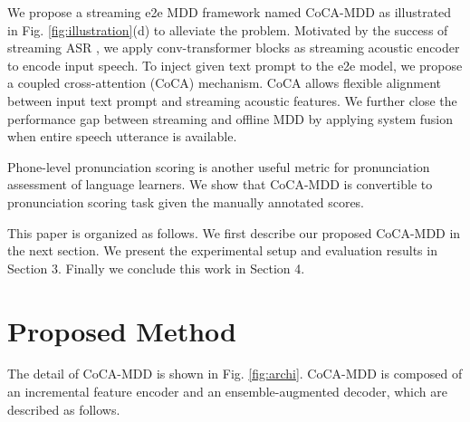 \documentclass[a4paper]{article}
\begin{document}
We propose a streaming e2e MDD framework named CoCA-MDD as illustrated in Fig. \ref{fig:illustration}(d) to alleviate the problem. Motivated by the success of streaming ASR \cite{He2019StreamingES, Huang2020ConvTransformerTL, Li2020TowardsFA}, we apply conv-transformer blocks \cite{Huang2020ConvTransformerTL} as streaming acoustic encoder to encode input speech. To inject given text prompt to the e2e model, we propose a coupled cross-attention (CoCA) mechanism. CoCA allows flexible alignment between input text prompt and streaming acoustic features. %
We further close the performance gap between streaming and offline MDD by applying system fusion when entire speech utterance is available.

Phone-level pronunciation scoring is another useful metric for pronunciation assessment of language learners. We show that CoCA-MDD is convertible to pronunciation scoring task given the manually annotated scores.

This paper is organized as follows. We first describe our proposed CoCA-MDD in the next section. We present the experimental setup and evaluation results in Section 3. Finally we conclude this work in Section 4. 

\section{Proposed Method}
The detail of CoCA-MDD  is shown in Fig. \ref{fig:archi}. CoCA-MDD is composed of an incremental feature encoder and an ensemble-augmented decoder, which are described as follows. 
\end{document}
